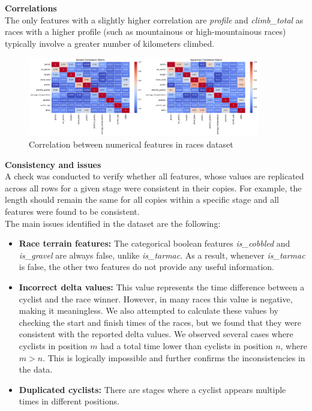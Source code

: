 \noindent
\textbf{Correlations}\\
The only features with a slightly higher correlation are \textit{profile} and \textit{climb\_total} as races with a higher profile (such as mountainous or high-mountainous races) typically involve a greater number of kilometers climbed.\\

\begin{center}
    \begin{figure}[H]
    \includegraphics[width=0.9\textwidth]{images/DU/races_corr.png}
    \caption{Correlation between numerical features in races dataset}
    \end{figure}
\end{center}

\vspace{-1.2cm}
\noindent
\textbf{Consistency and issues}\\
A check was conducted to verify whether all features, whose values are replicated across all rows for a given stage were consistent in their copies. For example, the length should remain the same for all copies within a specific stage and all features were found to be consistent. \\
The main issues identified in the dataset are the following:

\begin{itemize}
    \item \textbf{Race terrain features:} The categorical boolean features \textit{is\_cobbled} and \textit{is\_gravel} are always false, unlike \textit{is\_tarmac}. As a result, whenever \textit{is\_tarmac} is false, the other two features do not provide any useful information.
    \item \textbf{Incorrect delta values:} This value represents the time difference between a cyclist and the race winner. However, in many races this value is negative, making it meaningless. We also attempted to calculate these values by checking the start and finish times of the races, but we found that they were consistent with the reported delta values. We observed several cases where cyclists in position $m$ had a total time lower than cyclists in position $n$, where $m > n$. This is logically impossible and further confirms the inconsistencies in the data.
    \item \textbf{Duplicated cyclists:} There are stages where a cyclist appears multiple times in different positions.
\end{itemize}


